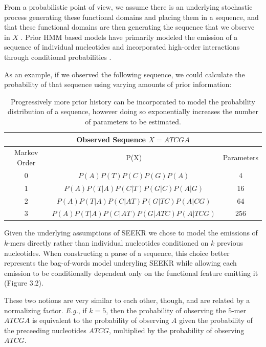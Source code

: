 From a probabilistic point of view, we assume there is an underlying stochastic process generating these functional domains and placing them in a sequence, and that these functional domains are then generating the sequence that we observe in $X$ \cite{Rabiner1989ARecognition}. Prior HMM based models have primarily modeled the emission of a sequence of individual nucleotides and incorporated high-order interactions through conditional probabilities \cite{Burge1997PredictionDNA,Pachter2002ApplicationsProblems,Henderson1997FindingModel}. 

As an example, if we observed the following sequence, we could calculate the probability of that sequence using varying amounts of prior information:

\begin{table}[h!]
\centering
 \begin{tabular}{|c | c| c |}
 \hline
 \multicolumn{3}{|c|}{Observed Sequence $X = ATCGA$}\\
 \hline
 Markov Order & P(X) & Parameters\\
 \hline\hline
 0 & $P(A)P(T)P(C)P(G)P(A)$ & 4 \\ 
 \hline
 1 & $P(A)P(T|A)P(C|T)P(G|C)P(A|G)$ & 16\\
 \hline
 2 & $P(A)P(T|A)P(C|AT)P(G|TC)P(A|CG)$ & 64 \\
 \hline
 3 & $P(A)P(T|A)P(C|AT)P(G|ATC)P(A|TCG)$ & 256 \\
 \hline
 
\end{tabular}
\caption{Progressively more prior history can be incorporated to model the probability distribution of a sequence, however doing so exponentially increases the number of parameters to be estimated.}
\label{table:1}
\end{table}


Given the underlying assumptions of SEEKR \cite{Kirk2018FunctionalContent} we chose to model the emissions of $k$-mers directly rather than individual nucleotides conditioned on $k$ previous nucleotides. When constructing a parse of a sequence, this choice better represents the bag-of-words model underyling SEEKR \cite{Kirk2018FunctionalContent} while allowing each emission to be conditionally dependent only on the functional feature emitting it (Figure 3.2).

These two notions are very similar to each other, though, and are related by a normalizing factor. \emph{E.g.}, if $k=5$, then the probability of observing the $5$-mer $ATCGA$ is equivalent to the probability of observing $A$ given the probability of the preceeding nucleotides $ATCG$, multiplied by the probability of observing $ATCG$. 

